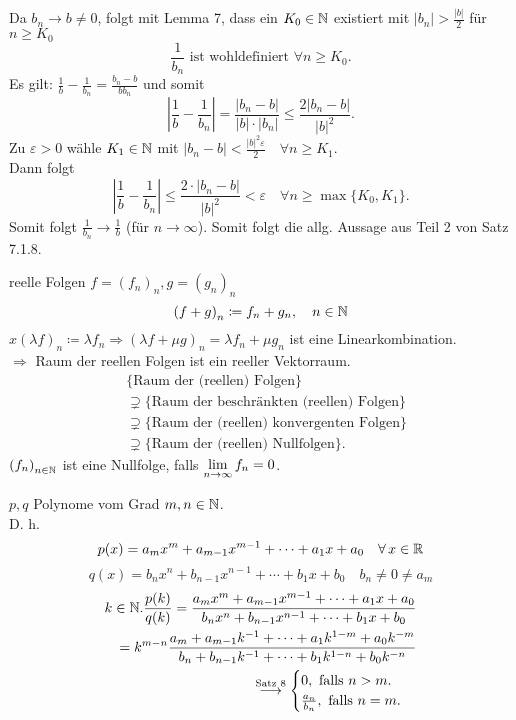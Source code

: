 \documentclass[../ana1.tex]{subfiles}
\begin{document}
\begin{bew}
\begin{enumerate}
		Da \(b_n \rightarrow b \neq 0\), folgt mit Lemma 7, dass ein \(K_0\in\mathbb{N} \) existiert mit \(|b_n| >\frac{|b|}{2} \) für \(n\geq K_0\) 
		\[\frac{1}{b_n} \text{ ist wohldefiniert } \forall n\geq K_0.\]
		Es gilt: \( \frac{1}{b} - \frac{1}{b_n} = \frac{b_n - b}{b b_n} \) und somit 
		\[ \left| \frac{1}{b} - \frac{1}{b_n} \right| = \frac{|b_n-b|}{|b| \cdot |b_n|} \leq \frac{2 |b_n - b|}{|b|^2}. \]
		Zu \(\varepsilon >0 \) wähle \(K_1 \in \mathbb{N} \) mit \(|b_n - b| < \frac{|b|^2\varepsilon}{2} \quad \forall n\geq K_1 \).\\
		Dann folgt 
		\[ \left| \frac{1}{b} - \frac{1}{b_n} \right| \leq \frac{2 \cdot |b_n - b|}{|b|^2} < \varepsilon \quad \forall n\geq\max \{ K_0,K_1\}. \]
		Somit folgt \( \frac{1}{b_n} \rightarrow \frac{1}{b} \) (für \(n\rightarrow \infty \)). Somit folgt die allg. Aussage aus Teil 2 von Satz 7.1.8.
	\end{enumerate}
\end{bew}

reelle Folgen \(f = {(f_n)}_n, g = {(g_n)}_n  \) \\
\[ {(f+g)}_n \coloneqq f_n + g_n, \quad n\in\mathbb{N} \]
\(x {(\lambda f)}_n \coloneqq \lambda f_n \Rightarrow {(\lambda f + \mu g)}_n = \lambda f_n + \mu g_n \) ist eine Linearkombination.\\
\(\Rightarrow{}\) Raum der reellen Folgen ist ein reeller Vektorraum.
\begin{align*}
	&\{ \text{Raum der (reellen) Folgen} \} \\
	&\supsetneq \{ \text{Raum der beschränkten (reellen) Folgen} \} \\
	&\supsetneq \{ \text{Raum der (reellen) konvergenten Folgen} \} \\
	&\supsetneq \{ \text{Raum der (reellen) Nullfolgen} \}.
\end{align*}
\({(f_n)}_{n\in\mathbb{N}}\) ist eine Nullfolge, falls \( \lim\limits_{n\rightarrow\infty} f_n = 0 \).

\begin{bsp}[1]
	\( p,q \) Polynome vom Grad \(m,n\in\mathbb{N} \).\\
	D. h. \[ p(x) = a_m x^m + a_{m-1} x^{m-1} + \cdots + a_1 x + a_0 \quad \forall x\in\R \]
	\[q(x) = b_n x^n + b_{n-1} x^{n-1} + \cdots + b_1 x + b_0 \quad b_n \neq 0 \neq a_m \]
	\begin{align*}
		k\in\mathbb{N}. \frac{p(k)}{q(k)} = \frac{a_m x^m + a_{m-1} x^{m-1} + \cdots + a_1 x + a_0}{b_n x^n + b_{n-1} x^{n-1} + \cdots + b_1 x + b_0}\\
		= k^{m-n} \frac{a_m + a_{m-1} k^{-1} + \cdots + a_1 k^{1-m} + a_0 k^{-m} }{b_n + b_{n-1} k^{-1} + \cdots + b_1 k^{1-n} + b_0 k^{-n}}\\
		\overset{\text{Satz 8}}{\longrightarrow}
		\begin{cases}
			0, \text{ falls } n>m.\\
			\frac{a_n}{b_n}, \text{ falls } n = m.
		\end{cases}
	\end{align*}
\end{bsp}
\end{document}
